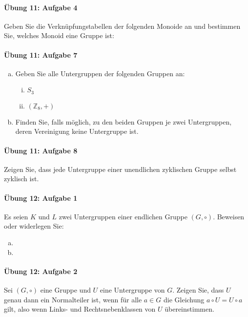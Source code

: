 \documentclass
[
  draft    = true,
  fontsize = 11pt,
  parskip  = half-,
  BCOR     = 0pt,
  DIV      = 11,
  ngerman,
  dvipsnames
]
{scrartcl}
\begin{document}
\paragraph{Übung 11: Aufgabe 4}
Geben Sie die Verknüpfungstabellen der folgenden Monoide an und bestimmen
Sie, welches Monoid eine Gruppe ist:

\paragraph{Übung 11: Aufgabe 7}
\begin{enumerate}[a)]
  \item Geben Sie alle Untergruppen der folgenden Gruppen an:
        \begin{enumerate}[i)]
          \item $S_3$
          \item $(\mathbb{Z}_8,+)$
        \end{enumerate}
  \item Finden Sie, falls möglich, zu den beiden Gruppen je zwei
        Untergruppen, deren Vereinigung keine Untergruppe ist.
\end{enumerate}

\paragraph{Übung 11: Aufgabe 8}
Zeigen Sie, dass jede Untergruppe einer unendlichen zyklischen Gruppe selbst zyklisch ist.

\paragraph{Übung 12: Aufgabe 1}
Es seien $K$ und $L$ zwei Untergruppen einer endlichen Gruppe $(G,\circ)$.
Beweisen oder widerlegen Sie:
\begin{enumerate}[a)]
  \item
  \item
\end{enumerate}

\paragraph{Übung 12: Aufgabe 2}
Sei $(G, \circ)$ eine Gruppe und $U$ eine Untergruppe von $G$. Zeigen Sie, dass
$U$ genau dann ein Normalteiler ist, wenn für alle $a\in G$ die Gleichung
$a\circ U=U\circ a$ gilt, also wenn Links- und Rechtsnebenklassen von $U$
übereinstimmen.
\end{document}
